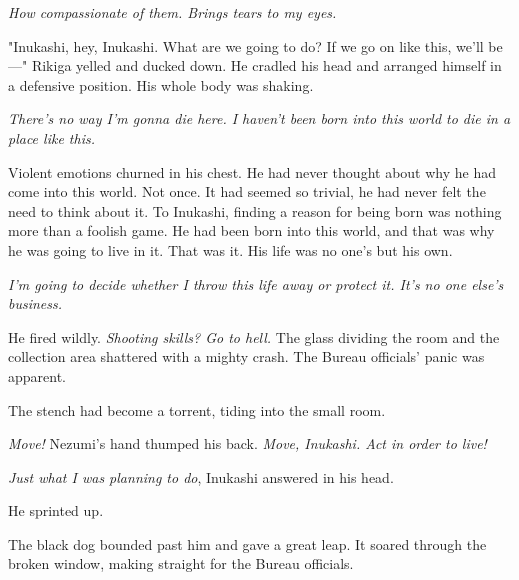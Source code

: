 \emph{How compassionate of them. Brings tears to my eyes.}

"Inukashi, hey, Inukashi. What are we going to do? If we go on like
this, we'll be---" Rikiga yelled and ducked down. He cradled his head and
arranged himself in a defensive position. His whole body was shaking.

\emph{There's no way I'm gonna die here. I haven't been born into this world
to die in a place like this.}

Violent emotions churned in his chest. He had never thought about why he
had come into this world. Not once. It had seemed so trivial, he had
never felt the need to think about it. To Inukashi, finding a reason for
being born was nothing more than a foolish game. He had been born into
this world, and that was why he was going to live in it. That was it.
His life was no one's but his own.

\emph{I'm going to decide whether I throw this life away or protect it. It's
no one else's business.}

He fired wildly. \emph{Shooting skills? Go to hell.} The glass dividing the
room and the collection area shattered with a mighty crash. The Bureau
officials' panic was apparent.

The stench had become a torrent, tiding into the small room.

\emph{Move!} Nezumi's hand thumped his back. \emph{Move, Inukashi. Act in order to
live!}

\emph{Just what I was planning to do}, Inukashi answered in his head.

He sprinted up.

The black dog bounded past him and gave a great leap. It soared through
the broken window, making straight for the Bureau officials.
